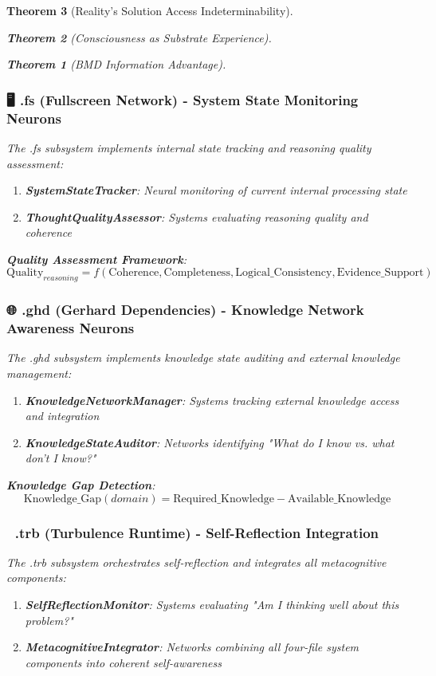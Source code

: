 \documentclass[12pt,a4paper]{article}
\newtheorem{theorem}{Theorem}[section]
\theoremstyle{remark}
\begin{document}
\begin{theorem}[Reality's Solution Access Indeterminability]
\begin{theorem}[Consciousness as Substrate Experience]
\begin{theorem}[BMD Information Advantage]
{\subsubsection{🖥️ .fs (Fullscreen Network) - System State Monitoring Neurons}

The .fs subsystem implements internal state tracking and reasoning quality assessment:

\begin{enumerate}
\item \textbf{SystemStateTracker}: Neural monitoring of current internal processing state
\item \textbf{ThoughtQualityAssessor}: Systems evaluating reasoning quality and coherence
\end{enumerate}

\textbf{Quality Assessment Framework}:
$$\text{Quality}_{reasoning} = f(\text{Coherence}, \text{Completeness}, \text{Logical}\_\text{Consistency}, \text{Evidence}\_\text{Support})$$

\subsubsection{🌐 .ghd (Gerhard Dependencies) - Knowledge Network Awareness Neurons}

The .ghd subsystem implements knowledge state auditing and external knowledge management:

\begin{enumerate}
\item \textbf{KnowledgeNetworkManager}: Systems tracking external knowledge access and integration
\item \textbf{KnowledgeStateAuditor}: Networks identifying "What do I know vs. what don't I know?"
\end{enumerate}

\textbf{Knowledge Gap Detection}:
$$\text{Knowledge}\_\text{Gap}(domain) = \text{Required}\_\text{Knowledge} - \text{Available}\_\text{Knowledge}$$

\subsubsection{🧠 .trb (Turbulence Runtime) - Self-Reflection Integration}

The .trb subsystem orchestrates self-reflection and integrates all metacognitive components:

\begin{enumerate}
\item \textbf{SelfReflectionMonitor}: Systems evaluating "Am I thinking well about this problem?"
\item \textbf{MetacognitiveIntegrator}: Networks combining all four-file system components into coherent self-awareness
\end{enumerate}

}
\end{theorem}
\end{theorem}
\end{theorem}
\end{document}

